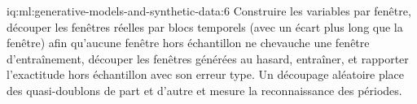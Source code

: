 \begin{solution}{iq:ml:generative-models-and-synthetic-data:6}
Construire les variables par fenêtre, découper les fenêtres réelles par blocs temporels (avec un écart plus long que la fenêtre) afin qu'aucune fenêtre hors
échantillon ne chevauche une fenêtre d'entraînement, découper les fenêtres générées au hasard, entraîner, et rapporter l'exactitude hors échantillon avec son erreur type.
Un découpage aléatoire place des quasi-doublons de part et d'autre et mesure la reconnaissance des périodes.
\end{solution}
